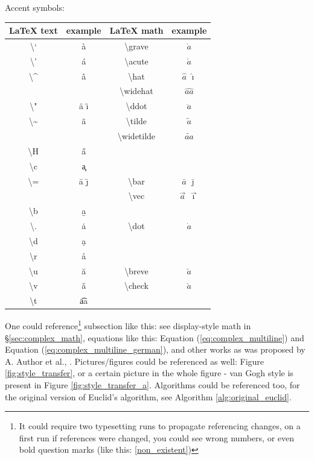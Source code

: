 \documentclass{article}
\begin{document}
\begin{center}
Accent  symbols:\\
\begin{tabular} {c | c | c | c }
{\LaTeX} \textbf{text} & example & {\LaTeX} \textbf{math} & example \\
\hline
\textbackslash` & \`a & \textbackslash grave  & $\grave{a}$ \\
\textbackslash' & \'a & \textbackslash acute & $\acute{a}$ \\
\textbackslash\textasciicircum & \^a & \textbackslash hat & $\hat{a}$ $\hat{\imath}$ \\
 &  & \textbackslash widehat & $\widehat{aa}$ \\
\textbackslash" & \"a \"{\i} & \textbackslash ddot & $\ddot{a}$ \\
\textbackslash\~ & \~a & \textbackslash tilde & $\tilde{a}$ \\
 &  & \textbackslash widetilde & $\widetilde{aa}$ \\
\textbackslash H & \H a & & \\
\textbackslash c & \c a & & \\
\textbackslash = & \={a} \={\j} & \textbackslash bar & $\bar{a}$ $\bar{\jmath}$ \\
 &  & \textbackslash vec & $\vec{a}$ $\vec{\imath}$ \\
\textbackslash b & \b{a} & & \\
\textbackslash . & \.{a} & \textbackslash dot & $\dot{a}$ \\
\textbackslash d & \d{a} & & \\
\textbackslash r & \r{a} & & \\
\textbackslash u & \u{a} & \textbackslash breve & $\breve{a}$ \\
\textbackslash v & \v{a} & \textbackslash check & $\check{a}$ \\
\textbackslash t & \t{aa} & & \\

\hline
\end{tabular}
\end{center}

One could reference\footnote{It could require two typesetting runs to propagate referencing changes, on a first run if references were changed, you could see wrong numbers, or even bold question marks (like this: \ref{non_existent})}
subsection like this: see display-style math in \S \ref{sec:complex_math}, equations like this: Equation (\ref{eq:complex_multiline}) and Equation (\ref{eq:complex_multiline_german}), and other works as was proposed by A. Author et al., \cite{author2016}. Pictures/figures could be referenced as well: Figure \ref{fig:style_transfer}, or a certain picture in the whole figure - van Gogh style is present in Figure \ref{fig:style_transfer_a}. Algorithms could be referenced too, for the original version of Euclid's algorithm, see Algorithm \ref{alg:original_euclid}.
\end{document}
